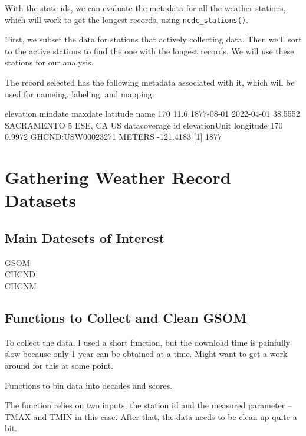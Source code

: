 \documentclass{article}
\begin{document}
With the state ids, we can evaluate the metadata for all the weather stations, which will work to get the longest records, using \texttt{ncdc\_stations()}. 

First, we subset the data for stations that actively collecting data. Then we'll sort to the active stations to find the one with the longest records. We will use these stations for our analysis.



The record selected has the following metadata associated with it, which will be used for nameing, labeling, and mapping. 

    elevation    mindate    maxdate latitude                    name
170      11.6 1877-08-01 2022-04-01  38.5552 SACRAMENTO 5 ESE, CA US
    datacoverage                id elevationUnit longitude
170       0.9972 GHCND:USW00023271        METERS -121.4183
[1] 1877


\section{Gathering Weather Record Datasets}

\subsection{Main Datesets of Interest}

\begin{description}
  \item[GSOM]
  \item[CHCND]
  \item[CHCNM]
\end{description}

\subsection{Functions to Collect and Clean GSOM}

To collect the data, I used a short function, but the download time is painfully slow because only 1 year can be obtained at a time. Might want to get a work around for this at some point. 



Functions to bin data into decades and scores. 



The function relies on two inputs, the station id and the measured parameter -- TMAX and TMIN in this case. After that, the data needs to be clean up quite a bit. 
\end{document}
